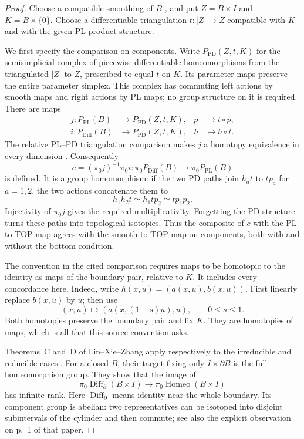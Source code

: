 \begin{proof}
Choose a compatible smoothing of $B$
\cite[Essay~I, p.~39]{KirbySiebenmann1977}, and put
$Z=B\times I$ and $K=B\times\{0\}$.  Choose a differentiable
triangulation $t:|Z|\to Z$ compatible with $K$ and with the given
PL product structure.

We first specify the comparison on components.  Write
$P_{\mathrm{PD}}(Z,t,K)$ for the semisimplicial complex of
piecewise differentiable homeomorphisms from the triangulated
$|Z|$ to $Z$, prescribed to equal $t$ on $K$.  Its parameter maps
preserve the entire parameter simplex.  This complex has commuting
left actions by smooth maps and right actions by PL maps; no group
structure on it is required.  There are maps
\[
 \begin{aligned}
 j:P_{\mathrm{PL}}(B)&\longrightarrow P_{\mathrm{PD}}(Z,t,K),
       &p&\longmapsto t\circ p,\\
 i:P_{\mathrm{Diff}}(B)&\longrightarrow P_{\mathrm{PD}}(Z,t,K),
       &h&\longmapsto h\circ t.
 \end{aligned}
\]
The relative PL--PD triangulation comparison makes $j$ a homotopy
equivalence in every dimension
\cite[pp.~1--2; Theorem~1.1(c), p.~8]{BurgheleaLashof1974I}.
Consequently
\[
 c=(\pi_0j)^{-1}\pi_0i:
     \pi_0P_{\mathrm{Diff}}(B)\longrightarrow
     \pi_0P_{\mathrm{PL}}(B)
\]
is defined.  It is a group homomorphism: if the two PD paths join
$h_at$ to $tp_a$ for $a=1,2$, the two actions concatenate them to
\[
                  h_1h_2t\simeq h_1tp_2\simeq tp_1p_2.
\]
Injectivity of $\pi_0j$ gives the required multiplicativity.
Forgetting the PD structure turns these paths into topological
isotopies.  Thus the composite of $c$ with the PL-to-TOP map agrees
with the smooth-to-TOP map on components, both with and without the
bottom condition.

The convention in the cited comparison requires maps to be
homotopic to the identity as maps of the boundary pair, relative to
$K$.  It includes every concordance here.  Indeed, write
$h(x,u)=(a(x,u),b(x,u))$.  First linearly replace $b(x,u)$ by $u$;
then use
\[
                   (x,u)\longmapsto(a(x,(1-s)u),u),
                   \qquad 0\leq s\leq1.
\]
Both homotopies preserve the boundary pair and fix $K$.  They are
homotopies of maps, which is all that this source convention asks.

Theorems~C and~D of Lin--Xie--Zhang apply respectively to the
irreducible and reducible cases
\cite[arXiv version~1, Theorem~C, p.~13 and its deduction on p.~14;
Theorem~D, p.~28]{LinXieZhang2026}.
For a closed $B$, their target fixing only $I\times\partial B$
is the full homeomorphism group.  They show that the image of
\[
 \pi_0\operatorname{Diff}_{\partial}(B\times I)
       \longrightarrow\pi_0\operatorname{Homeo}(B\times I)
\]
has infinite rank.  Here $\operatorname{Diff}_{\partial}$ means
identity near the whole boundary.  Its component group is abelian:
two representatives can be isotoped into disjoint subintervals
of the cylinder and then commute; see also the explicit observation
on p.~1 of that paper.


\end{proof}
